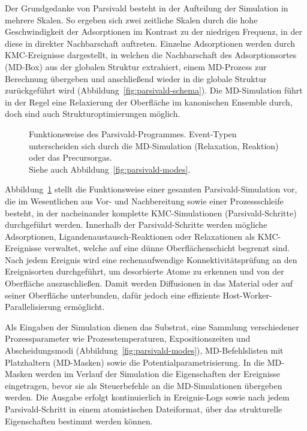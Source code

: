 Der Grundgedanke von Parsivald besteht in der Aufteilung der Simulation in mehrere Skalen.
So ergeben sich zwei zeitliche Skalen durch die hohe Geschwindigkeit der Adsorptionen im Kontrast zu der niedrigen Frequenz, in der diese in direkter Nachbarschaft auftreten.
Einzelne Adsorptionen werden durch KMC-Ereignisse dargestellt, in welchen die Nachbarschaft des Adsorptionsortes (MD-Box) aus der globalen Struktur extrahiert, einem MD-Prozess zur Berechnung übergeben und anschließend wieder in die globale Struktur zurückgeführt wird (Abbildung~\ref{fig:parsivald-schema}).
Die MD-Simulation führt in der Regel eine Relaxierung der Oberfläche im kanonischen Ensemble durch, doch sind auch Strukturoptimierungen möglich.

\begin{figure}
  \centering
  \def\svgwidth{\textwidth}
  
  \caption[Schema der Funktionsweise des Parsivald-Programmes]{
    Funktionsweise des Parsivald-Programmes.
    Event-Typen unterscheiden sich durch die MD-Simulation (Relaxation, Reaktion) oder das Precursorgas.\\
    Siehe auch Abbildung~\ref{fig:parsivald-modes}.
  }
  \label{fig:parsivald-stephierarchy}
\end{figure}

Abbildung~\ref{fig:parsivald-stephierarchy} stellt die Funktionsweise einer gesamten Parsivald-Simulation vor, die im Wesentlichen aus Vor- und Nachbereitung sowie einer Prozessschleife besteht, in der nacheinander komplette KMC-Simulationen (Parsivald-Schritte) durchgeführt werden.
Innerhalb der Parsivald-Schritte werden mögliche Adsorptionen, Ligandenaustausch-Reaktionen oder Relaxationen als KMC-Ereignisse verwaltet, welche auf eine dünne Oberflächenschicht begrenzt sind.
Nach jedem Ereignis wird eine rechenaufwendige Konnektivitätsprüfung an den Ereignisorten durchgeführt, um desorbierte Atome zu erkennen und von der Oberfläche auszuschließen.
Damit werden Diffusionen in das Material oder auf seiner Oberfläche unterbunden, dafür jedoch eine effiziente Host-Worker-Parallelisierung ermöglicht.

Als Eingaben der Simulation dienen das Substrat, eine Sammlung verschiedener Prozessparameter wie Prozesstemperaturen, Expositionszeiten und Abscheidungsmodi (Abbildung~\ref{fig:parsivald-modes}), MD-Befehlslisten mit Platzhaltern (MD-Masken) sowie die Potentialparametrisierung.
In die MD-Masken werden im Verlauf der Simulation die Eigenschaften der Ereignisse eingetragen, bevor sie als Steuerbefehle an die MD-Simulationen übergeben werden.
Die Ausgabe erfolgt kontinuierlich in Ereignis-Logs sowie nach jedem Parsivald-Schritt in einem atomistischen Dateiformat, über das strukturelle Eigenschaften bestimmt werden können.

